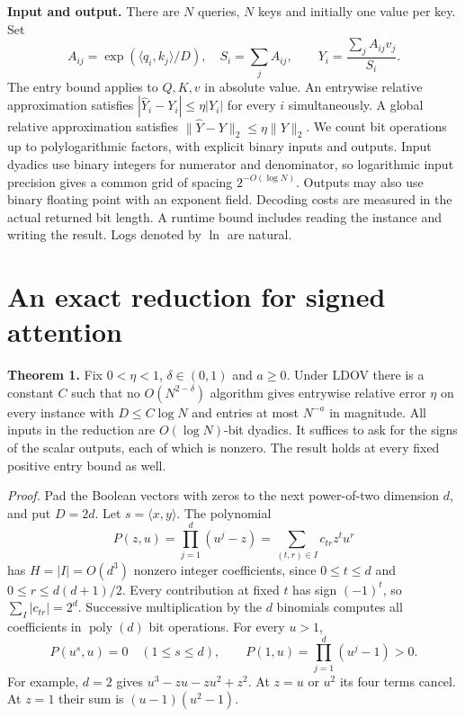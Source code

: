 \documentclass[11pt,letterpaper]{article}
\newcommand{\norm}[1]{\lVert#1\rVert}
\newcommand{\result}[1]{\smallskip\textbf{#1}\enspace}
\begin{document}
\result{Input and output.} There are $N$ queries, $N$ keys and initially one value per key. Set
\[
 A_{ij}=\exp(\langle q_i,k_j\rangle/D),\quad S_i=\sum_j A_{ij},\qquad
 Y_i=\frac{\sum_j A_{ij}v_j}{S_i}.
\]
The entry bound applies to $Q,K,v$ in absolute value. An entrywise relative approximation satisfies $|\widehat Y_i-Y_i|\le\eta |Y_i|$ for every $i$ simultaneously. A global relative approximation satisfies $\norm{\widehat Y-Y}_2\le\eta\norm Y_2$. We count bit operations up to polylogarithmic factors, with explicit binary inputs and outputs. Input dyadics use binary integers for numerator and denominator, so logarithmic input precision gives a common grid of spacing $2^{-O(\log N)}$. Outputs may also use binary floating point with an exponent field. Decoding costs are measured in the actual returned bit length. A runtime bound includes reading the instance and writing the result. Logs denoted by $\ln$ are natural.
\newpage

\section{An exact reduction for signed attention}
\result{Theorem 1.} Fix $0<\eta<1$, $\delta\in(0,1)$ and $a\ge0$. Under LDOV there is a constant $C$ such that no $O(N^{2-\delta})$ algorithm gives entrywise relative error $\eta$ on every instance with $D\le C\log N$ and entries at most $N^{-a}$ in magnitude. All inputs in the reduction are $O(\log N)$-bit dyadics. It suffices to ask for the signs of the scalar outputs, each of which is nonzero. The result holds at every fixed positive entry bound as well.

\textit{Proof.} Pad the Boolean vectors with zeros to the next power-of-two dimension $d$, and put $D=2d$. Let $s=\langle x,y\rangle$. The polynomial
\begin{equation}
 P(z,u)=\prod_{j=1}^d (u^j-z)=\sum_{(t,r)\in I} c_{tr} z^t u^r
 \label{poly}
\end{equation}
has $H=|I|=O(d^3)$ nonzero integer coefficients, since $0\le t\le d$ and $0\le r\le d(d+1)/2$. Every contribution at fixed $t$ has sign $(-1)^t$, so $\sum_I |c_{tr}|=2^d$. Successive multiplication by the $d$ binomials computes all coefficients in $\operatorname{poly}(d)$ bit operations. For every $u>1$,
\begin{equation}
 P(u^s,u)=0\quad(1\le s\le d),\qquad P(1,u)=\prod_{j=1}^d(u^j-1)>0 .
 \label{roots}
\end{equation}
For example, $d=2$ gives $u^3-zu-zu^2+z^2$. At $z=u$ or $u^2$ its four terms cancel. At $z=1$ their sum is $(u-1)(u^2-1)$.
\end{document}

